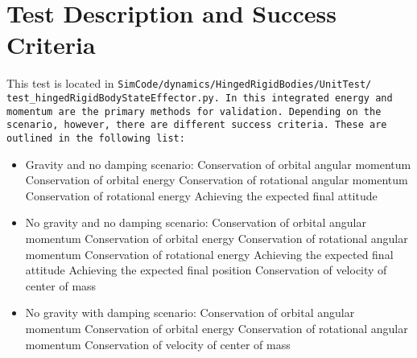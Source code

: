 \section{Test Description and Success Criteria}
This test is located in \tt SimCode/dynamics/HingedRigidBodies/UnitTest/\newline
test\_hingedRigidBodyStateEffector.py. In this integrated energy and momentum are the primary methods for validation. Depending on the scenario, however, there are different success criteria. These are outlined in the following list:
\begin{itemize}
	\item Gravity and no damping scenario:
	\subitem Conservation of orbital angular momentum
	\subitem Conservation of orbital energy
	\subitem Conservation of rotational angular momentum
	\subitem Conservation of rotational energy
	\subitem Achieving the expected final attitude
	\item No gravity and no damping scenario:
\subitem Conservation of orbital angular momentum
\subitem Conservation of orbital energy
\subitem Conservation of rotational angular momentum
\subitem Conservation of rotational energy
\subitem Achieving the expected final attitude
\subitem Achieving the expected final position
\subitem Conservation of velocity of center of mass
	\item No gravity with damping scenario:
\subitem Conservation of orbital angular momentum
\subitem Conservation of orbital energy
\subitem Conservation of rotational angular momentum
\subitem Conservation of velocity of center of mass

\end{itemize}
